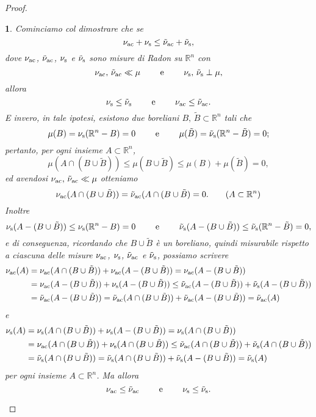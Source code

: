 \documentclass[a4paper,10pt,openright,oneside]{book}
\theoremstyle{theoremstyle}
\theoremstyle{theoremstylewoheader}
\theoremstyle{theoremstyle}
\theoremstyle{proofsecstyle}
\newtheorem{proofsec}{}
\theoremstyle{nonumberplain}
\newtheorem{proof}{Dim.}
\newcommand{\RR}{\ensuremath{\mathbb{R}}}
\begin{document}
\begin{proof}
\begin{proofsec}
Cominciamo col dimostrare che se
\[
\nu_\textup{ac} + \nu_\textup{s} \le \tilde{\nu}_\textup{ac} + \tilde{\nu}_\textup{s},
\]
dove $\nu_\textup{ac}$, $\tilde{\nu}_\textup{ac}$, $\nu_\textup{s}$ e $\tilde{\nu}_\textup{s}$ sono misure di Radon su $\RR^n$ con
\[
\nu_\textup{ac},\, \tilde{\nu}_\textup{ac} \ll \mu \qquad\text{ e }\qquad \nu_\textup{s},\, \tilde{\nu}_\textup{s} \perp \mu,
\]
allora
\[
\nu_\textup{s} \le \tilde{\nu}_\textup{s} \qquad\text{ e }\qquad \nu_\textup{ac} \le \tilde{\nu}_\textup{ac}.
\]
E invero, in tale ipotesi, esistono due boreliani $B,\, \tilde{B} \subset \RR^n$ tali che
\[
\mu(B) = \nu_\textup{s}(\RR^n - B) = 0 \qquad\text{ e }\qquad \mu(\tilde{B}) = \tilde{\nu}_\textup{s}(\RR^n - \tilde{B}) = 0;
\]
pertanto, per ogni insieme $A \subset \RR^n$,
\[
\mu(A \cap (B \cup \tilde{B})) \le \mu(B \cup \tilde{B}) \le \mu(B) + \mu(\tilde{B}) = 0,
\]
ed avendosi $\nu_\textup{ac},\, \tilde{\nu}_\textup{ac} \ll \mu$ otteniamo 
\[
\nu_\textup{ac}(A \cap (B \cup \tilde{B})) = \tilde{\nu}_\textup{ac}(A \cap (B \cup \tilde{B}) = 0.\qquad(A \subset \RR^n)
\] 
Inoltre 
\[
\nu_\textup{s}(A - (B \cup \tilde{B})) \le \nu_\textup{s}(\RR^n - B) = 0 \qquad\text{ e }\qquad \tilde{\nu}_\textup{s}(A - (B \cup \tilde{B})) \le \tilde{\nu}_\textup{s}(\RR^n - \tilde{B}) = 0,
\]
e di conseguenza, ricordando che $B \cup \tilde{B}$ è un boreliano, quindi misurabile rispetto a ciascuna delle misure $\nu_\textup{ac}$, $\nu_\textup{s}$, $\tilde{\nu}_\textup{ac}$ e $\tilde{\nu}_\textup{s}$, possiamo scrivere
\begin{align*}
\nu_\textup{ac}(A) &= \nu_\textup{ac}(A \cap (B \cup \tilde{B})) + \nu_\textup{ac}(A - (B \cup \tilde{B})) = \nu_\textup{ac}(A - (B \cup \tilde{B}))\\
&= \nu_\textup{ac}(A - (B \cup \tilde{B})) + \nu_\textup{s}(A - (B \cup \tilde{B})) \le \tilde{\nu}_\textup{ac}(A - (B \cup \tilde{B})) + \tilde{\nu}_\textup{s}(A - (B \cup \tilde{B}))\\
&= \tilde{\nu}_\textup{ac}(A - (B \cup \tilde{B})) = \tilde{\nu}_\textup{ac}(A \cap (B \cup \tilde{B})) + \tilde{\nu}_\textup{ac}(A - (B \cup \tilde{B})) = \tilde{\nu}_\textup{ac}(A) 
\end{align*}
e
\begin{align*}
\nu_\textup{s}(A) &= \nu_\textup{s}(A \cap (B \cup \tilde{B})) + \nu_\textup{s}(A - (B \cup \tilde{B})) = \nu_\textup{s}(A \cap (B \cup \tilde{B}))\\
&= \nu_\textup{ac}(A \cap (B \cup \tilde{B})) + \nu_\textup{s}(A \cap (B \cup \tilde{B})) \le \tilde{\nu}_\textup{ac}(A \cap (B \cup \tilde{B})) + \tilde{\nu}_\textup{s}(A \cap (B \cup \tilde{B}))\\
&= \tilde{\nu}_\textup{s}(A \cap (B \cup \tilde{B})) = \tilde{\nu}_\textup{s}(A \cap (B \cup \tilde{B})) + \tilde{\nu}_\textup{s}(A - (B \cup \tilde{B})) = \tilde{\nu}_\textup{s}(A) 
\end{align*}
per ogni insieme $A \subset \RR^n$. Ma allora
\[
\nu_\textup{ac} \le \tilde{\nu}_\textup{ac} \qquad\text{ e }\qquad \nu_\textup{s} \le \tilde{\nu}_\textup{s}.
\]
\end{proofsec}


\end{proof}
\end{document}
